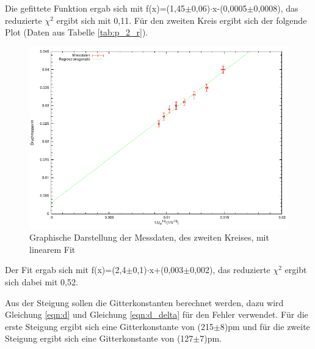 \documentclass[12pt,a4paper]{article}
\begin{document}
Die gefittete Funktion ergab sich mit f(x)=(1,45$\pm$0,06)$\cdot$x-(0,0005$\pm$0,0008), das reduzierte $\chi^2$ ergibt sich mit 0,11.
\newpage
Für den zweiten Kreis ergibt sich der folgende Plot (Daten aus Tabelle \ref{tab:p_2_r}).
\begin{figure}[H] 
  \centering
    \includegraphics[scale = 1]{kreis_2.pdf}
  	\caption[Graphische Darstellung der Messdaten, des zweiten Kreises, mit linearem Fit]{Graphische Darstellung der Messdaten, des zweiten Kreises, mit linearem Fit}
  \label{fig:plot_1}
\end{figure}

Der Fit ergab sich mit f(x)=(2,4$\pm$0,1)$\cdot$x+(0,003$\pm$0,002), das reduzierte $\chi^2$ ergibt sich dabei mit 0,52.

Aus der Steigung sollen die Gitterkonstanten berechnet werden, dazu wird Gleichung \ref{eqn:d} und Gleichung \ref{eqn:d_delta} für den Fehler verwendet. Für die erste Steigung ergibt sich eine Gitterkonstante von (215$\pm$8)pm und für die zweite Steigung ergibt sich eine Gitterkonstante von (127$\pm$7)pm.
\end{document}
